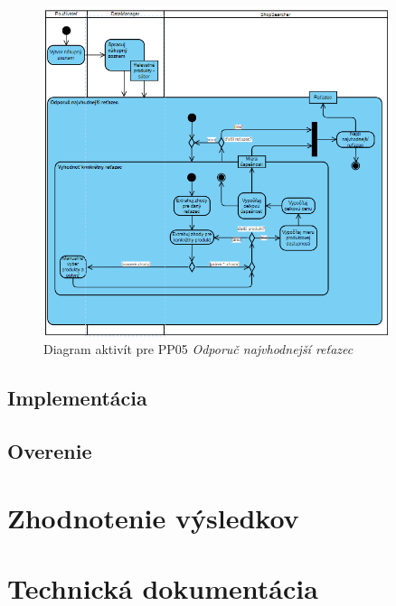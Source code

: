 \documentclass[twoside,slovak, a4paper]{article}
\begin{document}
\begin{figure}[tbh]
    \centering
    \includegraphics[width=0.9\textwidth]{pics/design/intelligent_shop_search.png}
    \caption{Diagram aktivít pre PP05 \textit{Odporuč najvhodnejší reťazec}}
    \label{fig:11}
\end{figure}


\subsection{Implementácia}

\subsection{Overenie}

\newpage

\section {Zhodnotenie výsledkov}



\newpage

\section {Technická dokumentácia}


\newpage





\end{document}
